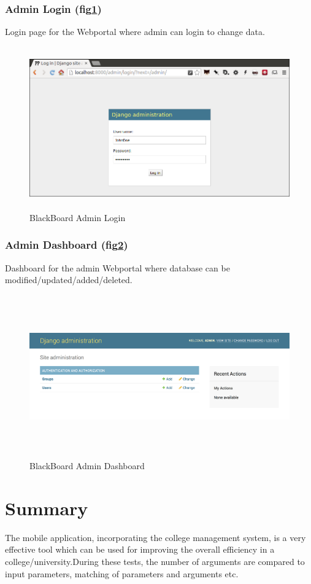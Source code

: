 \documentclass[BTech]{srmuthesis}
\begin{document}
\subsubsection{Admin Login (fig\ref{fig:django-login})}
Login page for the Webportal where admin can login to change data.
\begin{figure}[htbp]
	\centering
	\includegraphics[width=\linewidth, height=7cm,keepaspectratio]{djangologin}
	\caption{BlackBoard Admin Login}
	\label{fig:django-login}
\end{figure} 
\subsubsection{Admin Dashboard (fig\ref{fig:django-dash})}
Dashboard for the admin Webportal where database can be modified/updated/added/deleted.
\begin{figure}[htbp]
	\centering
	\includegraphics[width=\linewidth, height=7cm,keepaspectratio]{djangomanage}
	\caption{BlackBoard Admin Dashboard}
	\label{fig:django-dash}
\end{figure}
\section{Summary}
The mobile application, incorporating the college
management system, is a very effective tool
which can be used for improving the overall efficiency in a college/university.During these tests, the number of arguments are compared to input parameters, matching of parameters and arguments etc.
\end{document}
